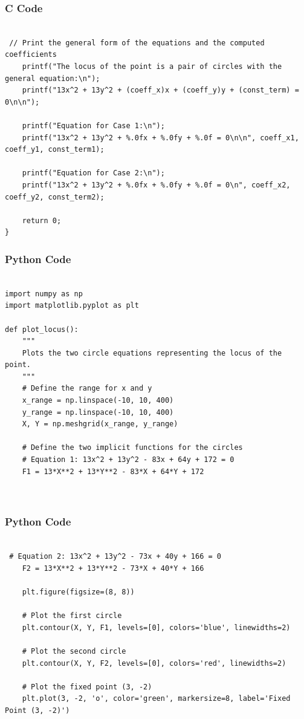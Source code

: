 \documentclass{beamer}
\begin{document}
\begin{frame}[fragile]
    \frametitle{C Code }
    \begin{lstlisting}

 // Print the general form of the equations and the computed coefficients
    printf("The locus of the point is a pair of circles with the general equation:\n");
    printf("13x^2 + 13y^2 + (coeff_x)x + (coeff_y)y + (const_term) = 0\n\n");
    
    printf("Equation for Case 1:\n");
    printf("13x^2 + 13y^2 + %.0fx + %.0fy + %.0f = 0\n\n", coeff_x1, coeff_y1, const_term1);

    printf("Equation for Case 2:\n");
    printf("13x^2 + 13y^2 + %.0fx + %.0fy + %.0f = 0\n", coeff_x2, coeff_y2, const_term2);

    return 0;
}

        \end{lstlisting}
\end{frame}

\begin{frame}[fragile]
    \frametitle{Python Code }
    \begin{lstlisting}

import numpy as np
import matplotlib.pyplot as plt

def plot_locus():
    """
    Plots the two circle equations representing the locus of the point.
    """
    # Define the range for x and y
    x_range = np.linspace(-10, 10, 400)
    y_range = np.linspace(-10, 10, 400)
    X, Y = np.meshgrid(x_range, y_range)

    # Define the two implicit functions for the circles
    # Equation 1: 13x^2 + 13y^2 - 83x + 64y + 172 = 0
    F1 = 13*X**2 + 13*Y**2 - 83*X + 64*Y + 172

   
        \end{lstlisting}
\end{frame}

\begin{frame}[fragile]
    \frametitle{Python Code }
    \begin{lstlisting}

 # Equation 2: 13x^2 + 13y^2 - 73x + 40y + 166 = 0
    F2 = 13*X**2 + 13*Y**2 - 73*X + 40*Y + 166

    plt.figure(figsize=(8, 8))

    # Plot the first circle
    plt.contour(X, Y, F1, levels=[0], colors='blue', linewidths=2)
    
    # Plot the second circle
    plt.contour(X, Y, F2, levels=[0], colors='red', linewidths=2)

    # Plot the fixed point (3, -2)
    plt.plot(3, -2, 'o', color='green', markersize=8, label='Fixed Point (3, -2)')

   


        \end{lstlisting}
\end{frame}
\end{document}
